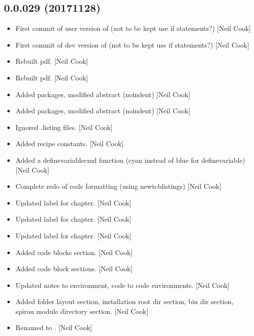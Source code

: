 \documentclass[a4paper,10pt,english]{report}
\begin{document}
\subsection{0.0.029 (2017\sphinxhyphen{}11\sphinxhyphen{}28)}
\label{\detokenize{misc/changelog:id541}}\begin{itemize}
\item {} 
First commit of user version of  (not to be kept \sphinxhyphen{}
use if statements?) {[}Neil Cook{]}

\item {} 
First commit of dev version of  (not to be kept \sphinxhyphen{} use
if statements?) {[}Neil Cook{]}

\item {} 
Rebuilt pdf. {[}Neil Cook{]}

\item {} 
Rebuilt pdf. {[}Neil Cook{]}

\item {} 
Added packages, modified abstract (noindent) {[}Neil Cook{]}

\item {} 
Added packages, modified abstract (noindent) {[}Neil Cook{]}

\item {} 
Ignored .listing files. {[}Neil Cook{]}

\item {} 
Added recipe constants. {[}Neil Cook{]}

\item {} 
Added a definevariablecmd function (cyan instead of blue for
definevariable) {[}Neil Cook{]}

\item {} 
Complete redo of code formatting (using newtcblistings) {[}Neil Cook{]}

\item {} 
Updated label for chapter. {[}Neil Cook{]}

\item {} 
Updated label for chapter. {[}Neil Cook{]}

\item {} 
Updated label for chapter. {[}Neil Cook{]}

\item {} 
Added code blocks section. {[}Neil Cook{]}

\item {} 
Added code block sections. {[}Neil Cook{]}

\item {} 
Updated notes to environment, code to code environments. {[}Neil Cook{]}

\item {} 
Added folder layout section, installation root dir section, bin dir
section, spirou module directory section. {[}Neil Cook{]}

\item {} 
Renamed  to . {[}Neil Cook{]}

\end{itemize}
\end{document}
